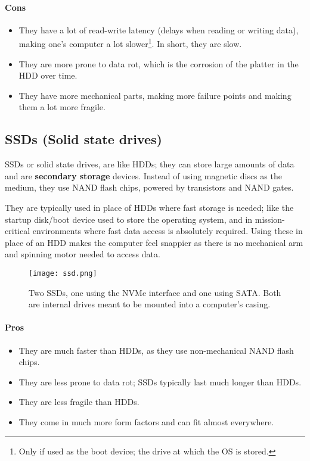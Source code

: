 \documentclass[../main.tex]{subfiles}
\begin{document}
\paragraph{Cons}
\begin{itemize}
    \item They have a lot of read-write latency (delays when reading or writing data), making one's computer a lot slower\footnote{Only if used as the boot device; the drive at which the OS is stored.}. In short, they are slow.
    \item They are more prone to data rot, which is the corrosion of the platter in the HDD over time.
    \item They have more mechanical parts, making more failure points and making them a lot more fragile.
\end{itemize}

\subsection{SSDs (Solid state drives)}

SSDs or solid state drives, are like HDDs; they can store large amounts of data and are \textbf{secondary storage} devices. Instead of using magnetic discs as the medium, they use NAND flash chips, powered by transistors and NAND gates.

They are typically used in place of HDDs where fast storage is needed; like the startup disk/boot device used to store the operating system, and in mission-critical environments where fast data access is absolutely required. Using these in place of an HDD makes the computer feel snappier as there is no mechanical arm and spinning motor needed to access data.

\begin{figure}[H]
    \centering
    \texttt{[image: ssd.png]}
    \caption{Two SSDs, one using the NVMe interface and one using SATA. Both are internal drives meant to be mounted into a computer's casing.}
    \label{fig:ssd}
\end{figure}

\paragraph{Pros}
\begin{itemize}
    \item They are much faster than HDDs, as they use non-mechanical NAND flash chips.
    \item They are less prone to data rot; SSDs typically last much longer than HDDs.
    \item They are less fragile than HDDs.
    \item They come in much more form factors and can fit almost everywhere.
\end{itemize}
\end{document}
